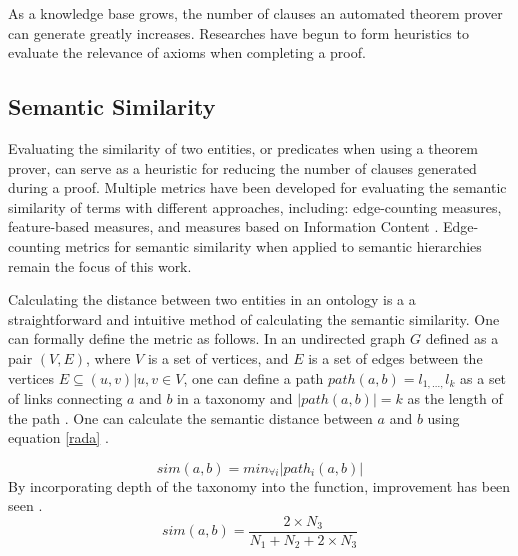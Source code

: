 \documentclass{article}
\begin{document}
As a knowledge base grows, the number of clauses an automated theorem prover can generate greatly increases. Researches have begun to form heuristics to evaluate the relevance of axioms when completing a proof. 

\subsection{Semantic Similarity}
Evaluating the similarity of two entities, or predicates when using a theorem prover, can serve as a heuristic for reducing the number of clauses generated during a proof. Multiple metrics have been developed for evaluating the semantic similarity of terms with different approaches, including: edge-counting measures, feature-based measures, and measures based on Information Content \cite{sanchez2012ontology} \cite{rodriguez1999assessing} \cite{roederer2009divvy}.  Edge-counting metrics for semantic similarity when applied to semantic hierarchies remain the focus of this work. 

Calculating the distance between two entities in an ontology is a a straightforward and intuitive method of calculating the semantic similarity. One can formally define the metric as follows. In an undirected graph $G$ defined as a pair $(V,E)$, where $V$ is a set of vertices, and $E$ is a set of edges between the vertices $E \subseteq {(u,v) | u, v \in V}$, one can define a path $path(a,b)=l_{1,\dots ,}l_k$ as a set of links connecting $a$ and $b$ in a taxonomy and $\lvert path(a,b) \rvert = k$ as the length of the path \cite{sanchez2012ontology}. One can calculate the semantic distance between $a$ and $b$ using equation \ref{rada} \cite{rada1989development}.

\begin{equation}
sim(a,b)=min_{\forall i}\lvert{path_i(a,b)}\rvert
\label{rada}
\end{equation}
By incorporating depth of the taxonomy into the function, improvement has been seen \cite{wu1994verbs}.
\begin{equation}
sim(a,b)=\frac{2 \times N_3}{N_1+N_2+2 \times N_3}
\label{wu}
\end{equation}

\newpage
\vspace*{.05in}
\end{document}
